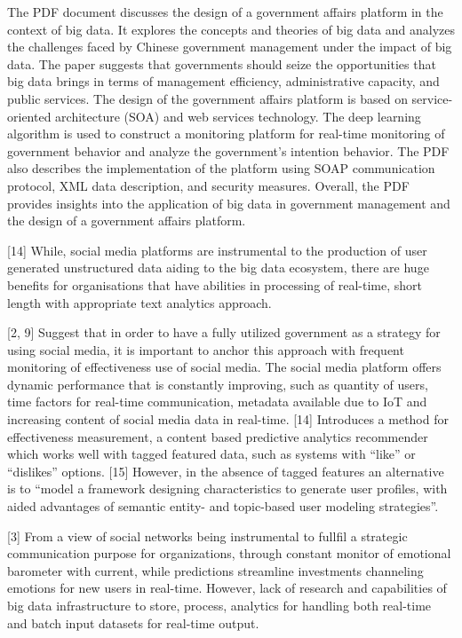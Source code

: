 The PDF document discusses the design of a government affairs platform in the context of big data. It explores the concepts and theories of big data and analyzes the challenges faced by Chinese government management under the impact of big data. The paper suggests that governments should seize the opportunities that big data brings in terms of management efficiency, administrative capacity, and public services. The design of the government affairs platform is based on service-oriented architecture (SOA) and web services technology. The deep learning algorithm is used to construct a monitoring platform for real-time monitoring of government behavior and analyze the government's intention behavior. The PDF also describes the implementation of the platform using SOAP communication protocol, XML data description, and security measures. Overall, the PDF provides insights into the application of big data in government management and the design of a government affairs platform.

[14] While, social media platforms are instrumental to the production of user generated unstructured data aiding to the big data ecosystem, there are huge  benefits for organisations that have abilities in processing of real-time, short length with appropriate text analytics approach.

[2, 9] Suggest that in order to have a fully utilized government as a strategy for using social media, it is important to anchor this approach with frequent monitoring of effectiveness use of social media.  The social media platform offers dynamic performance that is constantly improving, such as quantity of users, time factors for real-time communication, metadata available due to IoT and increasing content of social media data in real-time.  [14] Introduces a method for effectiveness measurement, a content based predictive analytics recommender which works well with tagged featured data, such as systems with “like” or “dislikes” options.  [15] However, in the absence of tagged features an alternative is to “model a framework designing characteristics to generate user profiles, with aided advantages of semantic entity- and topic-based user modeling strategies”.  

[3] From a view of social networks being instrumental to fullfil a strategic communication purpose for organizations,  through constant monitor of emotional barometer with current, while predictions streamline investments channeling emotions for new users in real-time.  However, lack of research and capabilities of big data infrastructure to store, process, analytics for handling both real-time and batch input datasets for real-time output.


